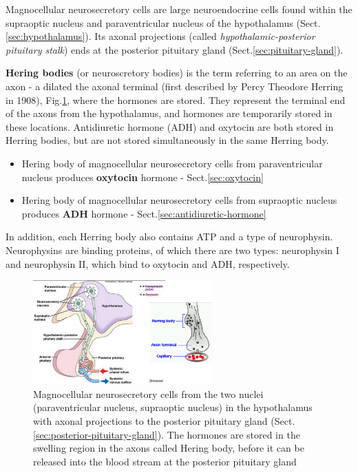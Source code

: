 Magnocellular neurosecretory cells are large neuroendocrine cells found within
the supraoptic nucleus and paraventricular nucleus of the hypothalamus
(Sect.\ref{sec:hypothalamus}). Its axonal projections (called {\it
hypothalamic-posterior pituitary stalk}) ends at the posterior pituitary gland
(Sect.\ref{sec:pituitary-gland}).

{\bf Hering bodies} (or neuroscretory bodies) is the term referring to an area
on the axon - a dilated the axonal terminal (first described by Percy Theodore
Herring in 1908), Fig.\ref{fig:posterior-pituitary-gland}, where the hormones
are stored. They represent the terminal end of the axons from the hypothalamus,
and hormones are temporarily stored in these locations. Antidiuretic hormone
(ADH) and oxytocin are both stored in Herring bodies, but are not stored
simultaneously in the same Herring body.

\begin{itemize}
  \item  Hering body of magnocellular neurosecretory cells from
  paraventricular nucleus produces {\bf oxytocin} hormone -
  Sect.\ref{sec:oxytocin}
  
  \item  Hering body of magnocellular neurosecretory cells from
  supraoptic nucleus produces {\bf ADH} hormone -
  Sect.\ref{sec:antidiuretic-hormone}
\end{itemize}
In addition, each Herring body also contains ATP and a type of neurophysin.
Neurophysins are binding proteins, of which there are two types: neurophysin I
and neurophysin II, which bind to oxytocin and ADH, respectively.

\begin{figure}[hbt]
\centerline{\includegraphics[height=4cm]{./images/posterior-pituitary-gland.eps}}
\caption{Magnocellular neurosecretory
cells from the two nuclei (paraventricular nucleus, supraoptic
nucleus) in the hypothalamus with axonal
projections to the posterior pituitary
gland (Sect.\ref{sec:posterior-pituitary-gland}). The hormones are stored in
the swelling region in the axons called Hering
body, before it can be released into the
blood stream at the posterior pituitary
gland}\label{fig:posterior-pituitary-gland}
\end{figure} 


